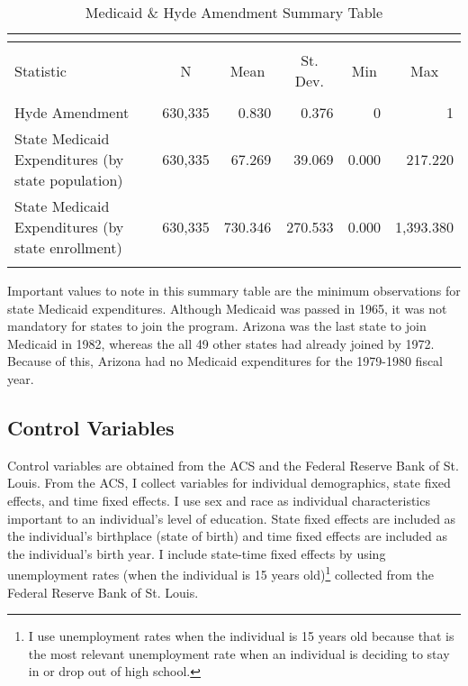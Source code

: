         \begingroup\footnotesize
        \begin{longtable}[h]{l|rrrrr}
        \caption{Medicaid \& Hyde Amendment Summary Table}  \\
        \label{medicaid.hyde_table}
        \\[-4ex]\hline
        \hline \\[-4ex]
        Statistic & \multicolumn{1}{c}{N} & \multicolumn{1}{c}{Mean} & \multicolumn{1}{c}{St. Dev.} & \multicolumn{1}{c}{Min} & \multicolumn{1}{c}{Max} \\
        \hline \\[-4ex]
        Hyde Amendment & 630,335 & 0.830 & 0.376 & 0 & 1 \\
        State Medicaid Expenditures (by state population) & 630,335 & 67.269 & 39.069 & 0.000 & 217.220 \\
        State Medicaid Expenditures (by state enrollment) & 630,335 & 730.346 & 270.533 & 0.000 & 1,393.380 \\
        \hline \\[-4ex]
        \end{longtable}
        \endgroup

        Important values to note in this summary table are the minimum observations for state Medicaid expenditures. Although Medicaid was passed in 1965, it was not mandatory for states to join the program. Arizona was the last state to join Medicaid in 1982, whereas the all 49 other states had already joined by 1972. Because of this, Arizona had no Medicaid expenditures for the 1979-1980 fiscal year.

    \subsection{Control Variables}
        Control variables are obtained from the ACS and the Federal Reserve Bank of St. Louis. From the ACS, I collect variables for individual demographics, state fixed effects, and time fixed effects. I use sex and race as individual characteristics important to an individual's level of education. State fixed effects are included as the individual's birthplace (state of birth) and time fixed effects are included as the individual's birth year. I include state-time fixed effects by using unemployment rates (when the individual is 15 years old)\footnote{I use unemployment rates when the individual is 15 years old because that is the most relevant unemployment rate when an individual is deciding to stay in or drop out of high school.} collected from the Federal Reserve Bank of St. Louis.
